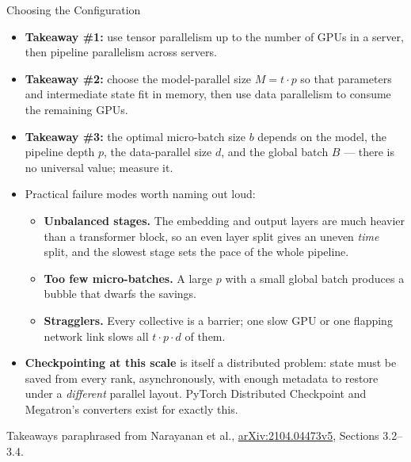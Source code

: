 \begin{frame}[allowframebreaks]{Choosing the Configuration}
  \begin{itemize}\itemsep0.4em
    \item[\textcolor{red}{$\blacktriangleright$}] \textbf{Takeaway \#1:} use tensor parallelism up to the number of GPUs in a server, then pipeline parallelism across servers.
    \item[\textcolor{red}{$\blacktriangleright$}] \textbf{Takeaway \#2:} choose the model-parallel size $M = t \cdot p$ so that parameters and intermediate state fit in memory, then use data parallelism to consume the remaining GPUs.
    \item[\textcolor{red}{$\blacktriangleright$}] \textbf{Takeaway \#3:} the optimal micro-batch size $b$ depends on the model, the pipeline depth $p$, the data-parallel size $d$, and the global batch $B$ --- there is no universal value; measure it.
    \item[\textcolor{red}{$\blacktriangleright$}] Practical failure modes worth naming out loud:
      \begin{itemize}\itemsep0.2em\footnotesize
        \item \textbf{Unbalanced stages.} The embedding and output layers are much heavier than a transformer block, so an even layer split gives an uneven \emph{time} split, and the slowest stage sets the pace of the whole pipeline.
        \item \textbf{Too few micro-batches.} A large $p$ with a small global batch produces a bubble that dwarfs the savings.
        \item \textbf{Stragglers.} Every collective is a barrier; one slow GPU or one flapping network link slows all $t \cdot p \cdot d$ of them.
      \end{itemize}
    \item[\textcolor{red}{$\blacktriangleright$}] \textbf{Checkpointing at this scale} is itself a distributed problem: state must be saved from every rank, asynchronously, with enough metadata to restore under a \emph{different} parallel layout. PyTorch Distributed Checkpoint and Megatron's converters exist for exactly this.
  \end{itemize}
  \vspace{0.1em}
  {\scriptsize Takeaways paraphrased from Narayanan et al., \href{https://arxiv.org/abs/2104.04473v5}{arXiv:2104.04473v5}, Sections 3.2--3.4.}
\end{frame}

